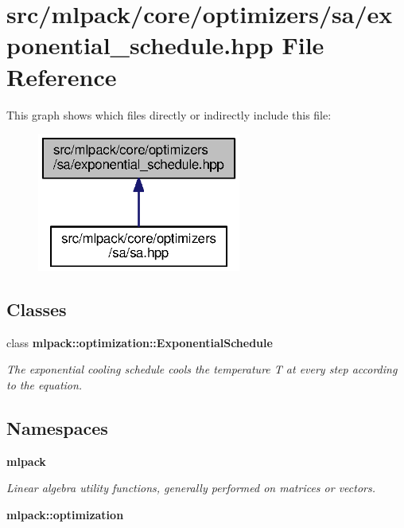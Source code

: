 \section{src/mlpack/core/optimizers/sa/exponential\+\_\+schedule.hpp File Reference}
\label{exponential__schedule_8hpp}
This graph shows which files directly or indirectly include this file\+:
\nopagebreak
\begin{figure}[H]
\begin{center}
\leavevmode
\includegraphics[width=190pt]{exponential__schedule_8hpp__dep__incl}
\end{center}
\end{figure}
\subsection*{Classes}
\begin{DoxyCompactItemize}
\item 
class {\bf mlpack\+::optimization\+::\+Exponential\+Schedule}
\begin{DoxyCompactList}\small\item\em The exponential cooling schedule cools the temperature T at every step according to the equation. \end{DoxyCompactList}\end{DoxyCompactItemize}
\subsection*{Namespaces}
\begin{DoxyCompactItemize}
\item 
 {\bf mlpack}
\begin{DoxyCompactList}\small\item\em Linear algebra utility functions, generally performed on matrices or vectors. \end{DoxyCompactList}\item 
 {\bf mlpack\+::optimization}
\end{DoxyCompactItemize}


